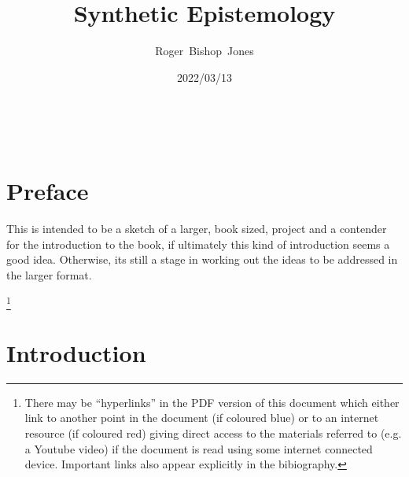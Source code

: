 \documentclass[10pt,titlepage]{article}
\title{\LARGE\bf Synthetic Epistemology}
\author{Roger~Bishop~Jones}
\date{\small 2022/03/13}
\newcommand{\ignore}[1]{}
\begin{document}
                               
\begin{titlepage}
\maketitle





\end{titlepage}

\ \

\ignore{
\begin{centering}
{}
\end{centering}
}%

\setcounter{tocdepth}{2}
{\parskip-0pt\tableofcontents}


\pagebreak

\section*{Preface}

This is intended to be a sketch of a larger, book sized, project and a contender for the introduction to the book, if ultimately this kind of introduction seems a good idea.
Otherwise, its still a stage in working out the ideas to be addressed in the larger format.

\footnote{There may be ``hyperlinks'' in the PDF version of this document which either link to another point in the document  (if coloured blue) or to an internet resource  (if coloured red) giving direct access to the materials referred to (e.g. a Youtube video) if the document is read using some internet connected device.
Important links also appear explicitly in the bibiography.}

\section{Introduction}
\end{document}
